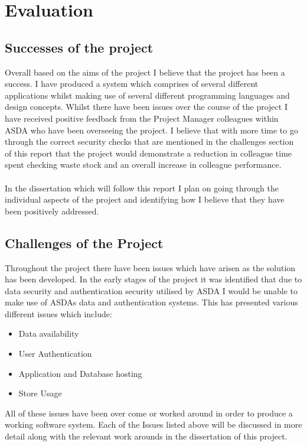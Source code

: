 \documentclass[a4paper,11pt]{report}
\begin{document}
\chapter{Evaluation}
\section {Successes of the project}
Overall based on the aims of the project I believe that the project has been a success. I have produced a system which comprises of several different applications whilst making use of several different programming languages and design concepts. 
 Whilst there have been issues over the course of the project I have received positive feedback from the Project Manager colleagues within ASDA who have been overseeing the project.
I believe that with more time to go through the correct security checks that are mentioned in the challenges section of this report that the project would demonstrate a reduction in 
colleague time spent checking waste stock and an overall increase in colleague performance. 
\\
\\
In the dissertation which will follow this report I plan on going through the individual aspects of the project and identifying how I believe that they have been positively addressed.

\section {Challenges of the Project}
Throughout the project there have been issues which have arisen as the solution has been developed. In the early stages of the project it was identified that due to data security and authentication security utilised by ASDA I would be unable to make use of ASDAs data and authentication systems. This has presented various different issues which include:
\begin{itemize}
    \item Data availability
    \item User Authentication
    \item Application and Database hosting
    \item Store Usage
\end{itemize}

All of these issues have been over come or worked around in order to produce a working software system. Each of the Issues listed above will be discussed in more detail along with the relevant work arounds in the dissertation of this project.
\end{document}

